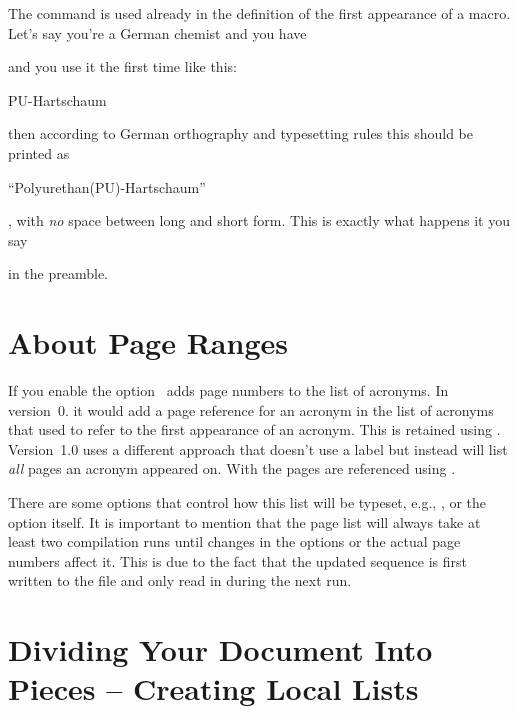 \documentclass[load-preamble+]{cnltx-doc}
\makeatletter
\newcommand\versionstar{\texorpdfstring{\@versionstar}{*}}
\makeatother
\begin{document}
The command  is used already in the definition of the first
appearance of a macro.  Let's say you're a German chemist and you have
\begin{sourcecode}
\end{sourcecode}
and you use it the first time like this:
\begin{sourcecode}
  \ac{PU}-Hartschaum
\end{sourcecode}
then according to German orthography and typesetting rules this should be
printed as
\begin{center}
  \enquote{Polyurethan(PU)-Hartschaum}
\end{center}
\ie, with \emph{no} space between long and short form.  This is exactly what
happens it you say
\begin{sourcecode}
\end{sourcecode}
in the preamble.

\section{About Page Ranges}
If you enable the  option \acro\ adds page numbers to the list
of acronyms.  In version~0.\versionstar{} it would add a page reference for an
acronym in the list of acronyms that used  to refer to the first
appearance of an acronym.  This is retained using .
Version~1.0 uses a different approach that doesn't use a label but instead
will list \emph{all} pages an acronym appeared on.  With  the
pages are referenced using .

There are some options that control how this list will be typeset, e.g.,
,  or the option 
itself.  It is important to mention that the page list will always take at
least two compilation runs until changes in the options or the actual page
numbers affect it.  This is due to the fact that the updated sequence is first
written to the  file and only read in during the next run.

\section{Dividing Your Document Into Pieces -- Creating Local
  Lists}\label{sec:divid-your-docum}
\end{document}
